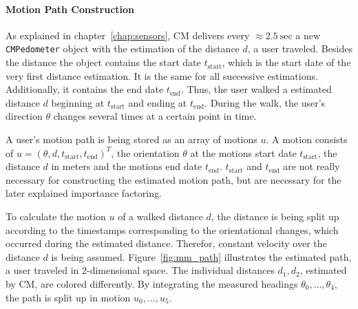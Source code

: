 \paragraph{Motion Path Construction}
As explained in chapter~\ref{chap:sensors}, \acs{CM} delivers every $\approx 2.5~\text{sec}$ a new \texttt{CMPedometer} object with the estimation of the distance $d$, a user traveled. Besides the distance the object contains the start date $t_\text{start}$, which is the start date of the very first distance estimation. It is the same for all successive estimations. Additionally, it contains the end date $t_\text{end}$. Thus, the user walked a estimated distance $d$ beginning at $t_\text{start}$ and ending at $t_\text{end}$. During the walk, the user's direction $\theta$ changes several times at a certain point in time.

A user's motion path is being stored as an array of motions $u$. A motion consists of $u = (\theta, d, t_\text{start}, t_\text{end})^T$, the orientation $\theta$ at the motions start date $t_\text{start}$, the distance $d$ in meters and the motions end date $t_\text{end}$. $t_\text{start}$ and $t_\text{end}$ are not really necessary for constructing the estimated motion path, but are necessary for the later explained importance factoring.

To calculate the motion $u$ of a walked distance $d$, the distance is being split up according to the timestamps corresponding to the orientational changes, which occurred during the estimated distance. Therefor, constant velocity over the distance $d$ is being assumed. Figure~\ref{fig:mm_path} illustrates the estimated path, a user traveled in 2-dimensional space. The individual distances $d_1, d_2$, estimated by \acs{CM}, are colored differently. By integrating the measured headings $\theta_0, \ldots, \theta_4$, the path is split up in motion $u_0, \ldots, u_5$.


